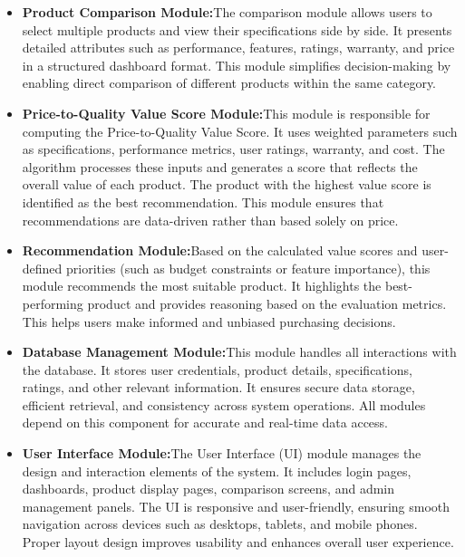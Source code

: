 \begin{itemize}
    \item \textbf{Product Comparison Module:}The comparison module allows users to select multiple products and view their specifications side by side. It presents detailed attributes such as performance, features, ratings, warranty, and price in a structured dashboard format. This module simplifies decision-making by enabling direct comparison of different products within the same category.
    \item \textbf{Price-to-Quality Value Score Module:}This module is responsible for computing the Price-to-Quality Value Score. It uses weighted parameters such as specifications, performance metrics, user ratings, warranty, and cost. The algorithm processes these inputs and generates a score that reflects the overall value of each product. The product with the highest value score is identified as the best recommendation. This module ensures that recommendations are data-driven rather than based solely on price.
    \item \textbf{Recommendation Module:}Based on the calculated value scores and user-defined priorities (such as budget constraints or feature importance), this module recommends the most suitable product. It highlights the best-performing product and provides reasoning based on the evaluation metrics. This helps users make informed and unbiased purchasing decisions.
    \item \textbf{Database Management Module:}This module handles all interactions with the database. It stores user credentials, product details, specifications, ratings, and other relevant information. It ensures secure data storage, efficient retrieval, and consistency across system operations. All modules depend on this component for accurate and real-time data access.
    \item \textbf{User Interface Module:}The User Interface (UI) module manages the design and interaction elements of the system. It includes login pages, dashboards, product display pages, comparison screens, and admin management panels. The UI is responsive and user-friendly, ensuring smooth navigation across devices such as desktops, tablets, and mobile phones. Proper layout design improves usability and enhances overall user experience.
    
\end{itemize}
